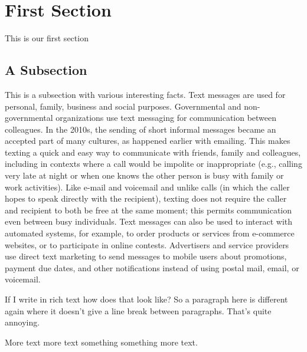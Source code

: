 \section{First Section}
This is our first section
\subsection{A Subsection}
This is a subsection with various interesting facts. Text messages are used for personal, family, business and social purposes. Governmental and non-governmental organizations use text messaging for communication between colleagues. In the 2010s, the sending of short informal messages became an accepted part of many cultures, as happened earlier with emailing. This makes texting a quick and easy way to communicate with friends, family and colleagues, including in contexts where a call would be impolite or inappropriate (e.g., calling very late at night or when one knows the other person is busy with family or work activities). Like e-mail and voicemail and unlike calls (in which the caller hopes to speak directly with the recipient), texting does not require the caller and recipient to both be free at the same moment; this permits communication even between busy individuals. Text messages can also be used to interact with automated systems, for example, to order products or services from e-commerce websites, or to participate in online contests. Advertisers and service providers use direct text marketing to send messages to mobile users about promotions, payment due dates, and other notifications instead of using postal mail, email, or voicemail. 

 If I write in rich text how does that look like? So a paragraph here is different again where it doesn't give a line break between paragraphs. That's quite annoying.
 
 More text more text something something more text.